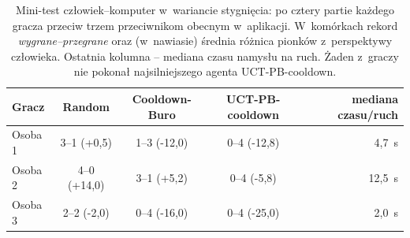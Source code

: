 \begin{table}[H]\centering\small
\begin{tabular}{lcccr}
\toprule
Gracz & Random & Cooldown-Buro & UCT-PB-cooldown & mediana czasu/ruch \\
\midrule
Osoba 1 & 3--1 (+0,5) & 1--3 (-12,0) & 0--4 (-12,8) & 4,7~s \\
Osoba 2 & 4--0 (+14,0) & 3--1 (+5,2) & 0--4 (-5,8) & 12,5~s \\
Osoba 3 & 2--2 (-2,0) & 0--4 (-16,0) & 0--4 (-25,0) & 2,0~s \\
\bottomrule
\end{tabular}
\caption{Mini-test człowiek--komputer w~wariancie stygnięcia: po cztery partie każdego gracza przeciw trzem przeciwnikom obecnym w~aplikacji. W~komórkach rekord \emph{wygrane--przegrane} oraz (w~nawiasie) średnia różnica pionków z~perspektywy człowieka. Ostatnia kolumna -- mediana czasu namysłu na ruch. Żaden z~graczy nie pokonał najsilniejszego agenta UCT-PB-cooldown.}
\label{tab:human}
\end{table}
